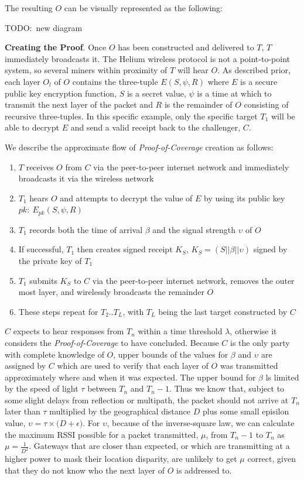 \documentclass[letterpaper,11pt]{article}
\newcommand{\todo}[1]{}
\renewcommand{\todo}[1]{{\color{red} TODO:\ {#1}}}
\begin{document}
The resulting $O$ can be visually represented as the following:

\todo{new diagram}

\textbf{Creating the Proof}. Once $O$ has been constructed and delivered to $T$, $T$ immediately broadcasts it. The Helium wireless protocol is not a point-to-point system, so several miners within proximity of $T$ will hear $O$. As described prior, each layer $O_l$ of $O$ contains the three-tuple ${E\left(S, \psi, R\right)}$ where $E$ is a secure public key encryption function, $S$ is a secret value, $\psi$ is a time at which to transmit the next layer of the packet and $R$ is the remainder of $O$ consisting of recursive three-tuples. In this specific example, only the specific target $T_1$ will be able to decrypt $E$ and send a valid receipt back to the challenger, $C$.

We describe the approximate flow of \emph{Proof-of-Coverage} creation as follows:

\begin{enumerate}
  \item $T$ receives $O$ from $C$ via the peer-to-peer internet network and immediately broadcasts it via the wireless network
  \item $T_1$ hears $O$ and attempts to decrypt the value of $E$ by using its public key $pk:\ E_{pk}\left(S, \psi, R\right)$
  \item $T_1$ records both the time of arrival $\beta$ and the signal strength $\upsilon$ of $O$
  \item If successful, $T_1$ then creates signed receipt $K_S$, $\mathit{K_S = \left(S || \beta || \upsilon\right)}$ signed by the private key of $T_1$
  \item $T_1$ submits $K_S$ to $C$ via the peer-to-peer internet network, removes the outer most layer, and wirelessly broadcasts the remainder $O$
  \item These steps repeat for $T_2$..$T_L$, with $T_L$ being the last target constructed by $C$
\end{enumerate}

$C$ expects to hear responses from $T_n$ within a time threshold $\lambda$, otherwise it considers the \emph{Proof-of-Coverage} to have concluded. Because $C$ is the only party with complete knowledge of $O$, upper bounds of the values for $\beta$ and $\upsilon$ are assigned by $C$ which are used to verify that each layer of $O$ was transmitted approximately where and when it was expected. The upper bound for $\beta$ ls limited by the speed of light $\tau$ between $T_n$ and $T_n-1$. Thus we know that, subject to some slight delays from reflection or multipath, the packet should not arrive at $T_n$ later than $\tau$ multiplied by the geographical distance $D$ plus some small episilon value, $\upsilon = \tau \times \Big(D + \epsilon\Big)$. For $\upsilon$, because of the inverse-square law, we can calculate the maximum RSSI possible for a packet transmitted, $\mu$, from $T_n-1$ to $T_n$ as $\mu = \frac{1}{D^2}$. Gateways that are closer than expected, or which are transmitting at a higher power to mask their location disparity, are unlikely to get $\mu$ correct, given that they do not know who the next layer of $O$ is addressed to.
\end{document}
